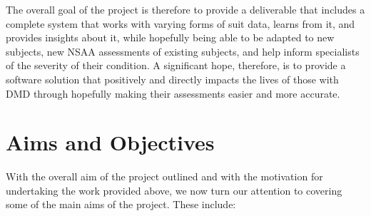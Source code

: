 \documentclass[12pt,twoside]{report}
\begin{document}
\quad The overall goal of the project is therefore to provide a deliverable that includes a complete system that works with varying forms of suit data, learns from it, and provides insights about it, while hopefully being able to be adapted to new subjects, new NSAA assessments of existing subjects, and help inform specialists of the severity of their condition. A significant hope, therefore, is to provide a software solution that positively and directly impacts the lives of those with DMD through hopefully making their assessments easier and more accurate.

\section{Aims and Objectives}

\quad With the overall aim of the project outlined and with the motivation for undertaking the work provided above, we now turn our attention to covering some of the main aims of the project. These include:\\
\end{document}
